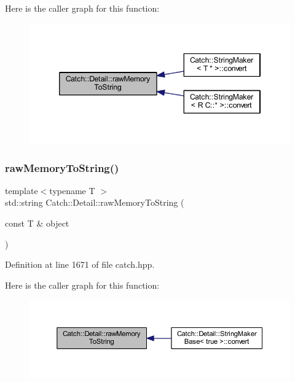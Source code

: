 Here is the caller graph for this function\+:\nopagebreak
\begin{figure}[H]
\begin{center}
\leavevmode
\includegraphics[width=346pt]{namespace_catch_1_1_detail_ac5d6c510e565ee5bddcc2236194ce29e_icgraph}
\end{center}
\end{figure}
\hypertarget{namespace_catch_1_1_detail_a371620ed524abfcae5c3772bf49b563a}{}\label{namespace_catch_1_1_detail_a371620ed524abfcae5c3772bf49b563a} 
\subsubsection{\texorpdfstring{raw\+Memory\+To\+String()}{rawMemoryToString()}\hspace{0.1cm}{\footnotesize\ttfamily [2/2]}}
{\footnotesize\ttfamily template$<$typename T $>$ \\
std\+::string Catch\+::\+Detail\+::raw\+Memory\+To\+String (\begin{DoxyParamCaption}\item[{const T \&}]{object }\end{DoxyParamCaption})\hspace{0.3cm}{\ttfamily [inline]}}



Definition at line 1671 of file catch.\+hpp.

Here is the caller graph for this function\+:\nopagebreak
\begin{figure}[H]
\begin{center}
\leavevmode
\includegraphics[width=350pt]{namespace_catch_1_1_detail_a371620ed524abfcae5c3772bf49b563a_icgraph}
\end{center}
\end{figure}
\hypertarget{namespace_catch_1_1_detail_aff0ca0f561ad8053654ab27d54486197}{}\label{namespace_catch_1_1_detail_aff0ca0f561ad8053654ab27d54486197} 
